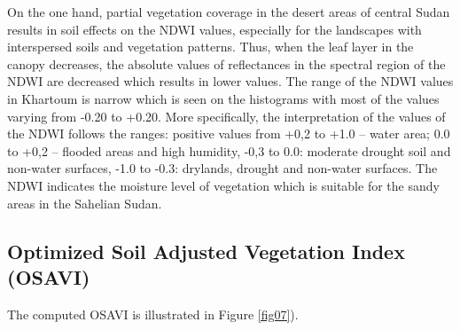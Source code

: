 \documentclass[jimaging,article,submit,pdftex,moreauthors]{Definitions/mdpi}
\begin{document}
On the one hand, partial vegetation coverage in the desert areas of central Sudan results in soil effects on the NDWI values, especially for the landscapes with interspersed soils and vegetation patterns. Thus, when the leaf layer in the canopy decreases, the absolute values of reflectances in the spectral region of the NDWI are decreased which results in lower values. The range of the NDWI values in Khartoum is narrow which is seen on the histograms with most of the values varying from -0.20 to +0.20. More specifically, the interpretation of the values of the NDWI follows the ranges: positive values from +0,2 to +1.0 -- water area; 0.0 to +0,2 -- flooded areas and high humidity, -0,3 to 0.0: moderate drought soil and non-water surfaces, -1.0 to -0.3: drylands, drought and non-water surfaces. The NDWI indicates the moisture level of vegetation which is suitable for the sandy areas in the Sahelian Sudan.

\subsection{Optimized Soil Adjusted Vegetation Index (OSAVI)}

The computed OSAVI is illustrated in Figure \ref{fig07}). 
\end{document}
